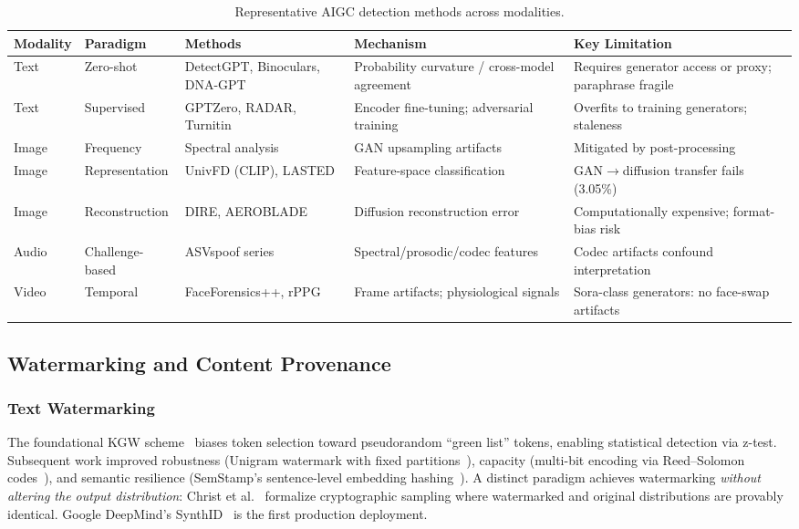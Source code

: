 \begin{table}[htbp]
\centering
\caption{Representative AIGC detection methods across modalities.}
\label{tab:detection}
\small
\begin{tabular}{p{1.3cm}p{2.0cm}p{2.8cm}p{2.5cm}p{3.5cm}}
\toprule
\textbf{Modality} & \textbf{Paradigm} & \textbf{Methods} & \textbf{Mechanism} & \textbf{Key Limitation} \\
\midrule
Text & Zero-shot & DetectGPT, Binoculars, DNA-GPT & Probability curvature / cross-model agreement & Requires generator access or proxy; paraphrase fragile \\
\addlinespace
Text & Supervised & GPTZero, RADAR, Turnitin & Encoder fine-tuning; adversarial training & Overfits to training generators; staleness \\
\addlinespace
Image & Frequency & Spectral analysis & GAN upsampling artifacts & Mitigated by post-processing \\
\addlinespace
Image & Representation & UnivFD (CLIP), LASTED & Feature-space classification & GAN$\to$diffusion transfer fails (3.05\%) \\
\addlinespace
Image & Reconstruction & DIRE, AEROBLADE & Diffusion reconstruction error & Computationally expensive; format-bias risk \\
\addlinespace
Audio & Challenge-based & ASVspoof series & Spectral/prosodic/codec features & Codec artifacts confound interpretation \\
\addlinespace
Video & Temporal & FaceForensics++, rPPG & Frame artifacts; physiological signals & Sora-class generators: no face-swap artifacts \\
\bottomrule
\end{tabular}
\end{table}


\subsection{Watermarking and Content Provenance}
\label{sec:watermark}

\subsubsection{Text Watermarking}
\label{sec:wm-text}

The foundational KGW scheme~\cite{kirchenbauer2023kgw} biases token selection toward pseudorandom ``green list'' tokens, enabling statistical detection via z-test. Subsequent work improved robustness (Unigram watermark with fixed partitions~\cite{zhao2023unigram}), capacity (multi-bit encoding via Reed--Solomon codes~\cite{qu2024multibit}), and semantic resilience (SemStamp's sentence-level embedding hashing~\cite{hou2023semstamp}). A distinct paradigm achieves watermarking \emph{without altering the output distribution}: Christ et al.~\cite{christ2024undetectable} formalize cryptographic sampling where watermarked and original distributions are provably identical. Google DeepMind's SynthID~\cite{synthidtext2024} is the first production deployment.


